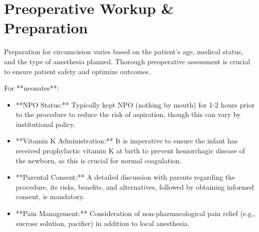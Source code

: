 \section*{Preoperative Workup \& Preparation}
Preparation for circumcision varies based on the patient's age, medical status, and the type of anesthesia planned. Thorough preoperative assessment is crucial to ensure patient safety and optimize outcomes.

For **neonates**:
\begin{itemize}
  \item **NPO Status:** Typically kept NPO (nothing by mouth) for 1-2 hours prior to the procedure to reduce the risk of aspiration, though this can vary by institutional policy.
  \item **Vitamin K Administration:** It is imperative to ensure the infant has received prophylactic vitamin K at birth to prevent hemorrhagic disease of the newborn, as this is crucial for normal coagulation.
  \item **Parental Consent:** A detailed discussion with parents regarding the procedure, its risks, benefits, and alternatives, followed by obtaining informed consent, is mandatory.
  \item **Pain Management:** Consideration of non-pharmacological pain relief (e.g., sucrose solution, pacifier) in addition to local anesthesia.
\end{itemize}

